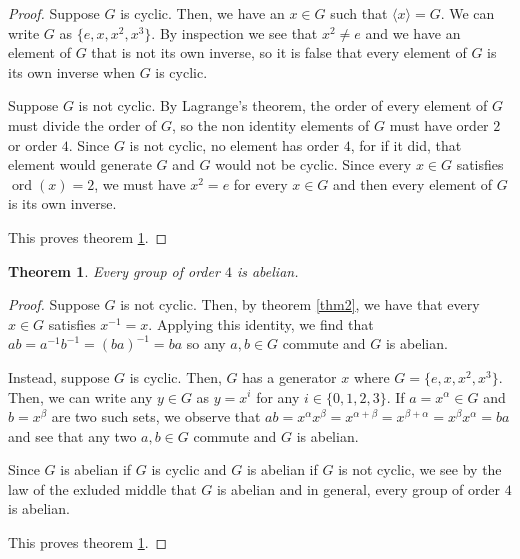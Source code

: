 \documentclass[12pt]{article}
\newcommand{\ord}{\operatorname{ord}}
\newtheorem{thm}{Theorem}
\begin{document}
\begin{proof}
	Suppose $G$ is cyclic.
	Then, we have an $x \in G$
	such that $\langle x \rangle = G$.
	We can write $G$ as $\{e, x, x^2, x^3 \}$.
	By inspection we see that $x^2 \neq e$
	and we have an element of $G$
	that is not its own inverse,
	so it is false that every element of $G$
	is its own inverse when $G$ is cyclic.

	Suppose $G$ is not cyclic.
	By Lagrange's theorem,
	the order of every element of $G$
	must divide the order of $G$,
	so the non identity elements of $G$
	must have order $2$ or order $4$.
	Since $G$ is not cyclic,
	no element has order $4$,
	for if it did,
	that element would generate $G$
	and $G$ would not be cyclic.
	Since every $x \in G$
	satisfies $\ord(x) = 2$,
	we must have $x^2 = e$
	for every $x \in G$
	and then every element of $G$
	is its own inverse.

	This proves theorem \ref{thm3}.
\end{proof}

\begin{thm} \label{thm3}
	Every group of order $4$ is abelian.
\end{thm}

\begin{proof}
	Suppose $G$ is not cyclic.
	Then, by theorem \ref{thm2},
	we have that every $x \in G$
	satisfies $x^{-1} = x$.
	Applying this identity,
	we find that $ab = a^{-1}b^{-1} = (ba)^{-1} = ba$
	so any $a,b \in G$ commute
	and $G$ is abelian.

	Instead, suppose $G$ is cyclic.
	Then, $G$ has a generator $x$
	where $G = \{ e, x, x^2, x^3 \}$.
	Then, we can write any $y \in G$
	as $y = x^i$ for any $i \in \{0, 1, 2, 3 \}$.
	If $a = x^\alpha \in G$ and $b = x^\beta$
	are two such sets,
	we observe that $ab = x^\alpha x^\beta = x^{\alpha + \beta} = x^{\beta + \alpha} =
	x^\beta x^\alpha = ba$
	and see that any two $a,b \in G$
	commute and $G$ is abelian.

	Since $G$ is abelian if $G$ is cyclic
	and $G$ is abelian if $G$ is not cyclic,
	we see by the law of the exluded middle
	that $G$ is abelian and in general,
	every group of order $4$ is abelian.

	This proves theorem \ref{thm3}.
\end{proof}
\end{document}
